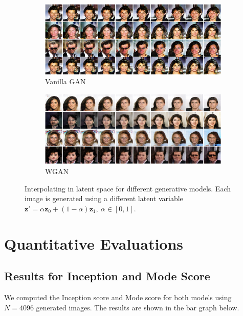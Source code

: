 \documentclass[table]{article}
\def\*#1{\mathbf{#1}}
\begin{document}
\newpage
\clearpage
\begin{figure}
  \centering
  \begin{subfigure}{\textwidth}
    \centering
    \includegraphics[scale=0.5]{imgs/gan_latent_lerp}
    \caption{Vanilla GAN}
  \end{subfigure}

  \vspace*{3mm}
  \begin{subfigure}{\textwidth}
    \centering
    \includegraphics[scale=0.5]{imgs/wgan_latent_lerp}
    \caption{WGAN}
  \end{subfigure}
  \caption{Interpolating in latent space for different generative models. Each image is generated using a different latent variable $\*z' = \alpha \*z_0 + (1-\alpha)\*z_1, \ \alpha \in [0,1]$.}
  \label{latent_lerp}
\end{figure}

\clearpage
\newpage
\section{Quantitative Evaluations}
\subsection{Results for Inception and Mode Score}
We computed the Inception score and Mode score for both models using $N=4096$ generated images. The results are shown in the bar graph below.
\end{document}

